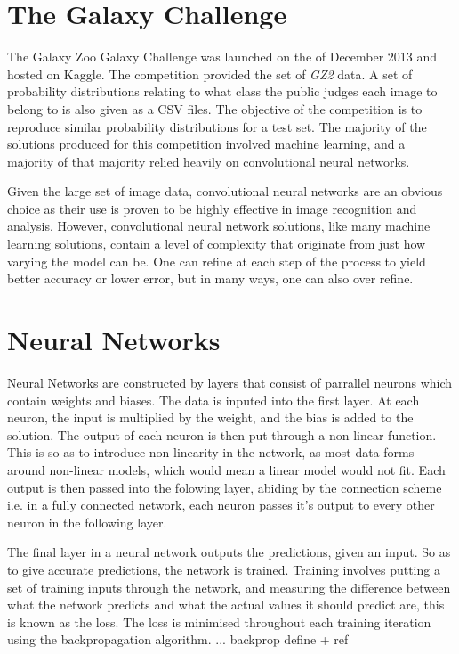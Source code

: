 \documentclass[12pt,a4paper,oneside,oldfontcommands]{memoir}
\begin{document}
\section{The Galaxy Challenge}

The Galaxy Zoo Galaxy Challenge was launched on the  of December 2013 and hosted on Kaggle. The competition provided the set of \textit{GZ2} data. A set of probability distributions relating to what class the public judges each image to belong to is also given as a CSV files. The objective of the competition is to reproduce similar probability distributions for a test set. The majority of the solutions produced for this competition involved machine learning, and a majority of that majority relied heavily on convolutional neural networks.

Given the large set of image data, convolutional neural networks are an obvious choice as their use is proven to be highly effective in image recognition and analysis. However, convolutional neural network solutions, like many machine learning solutions, contain a level of complexity that originate from just how varying the model can be. One can refine at each step of the process to yield better accuracy or lower error, but in many ways, one can also over refine.

\section{Neural Networks}
Neural Networks are constructed by layers that consist of parrallel neurons which contain weights and biases. The data is inputed into the first layer. At each neuron, the input is multiplied by the weight, and the bias is added to the solution.  The output of each neuron is then put through a non-linear function. This is so as to introduce non-linearity in the network, as most data forms around non-linear models, which would mean a linear model would not fit. Each output is then passed into the folowing layer, abiding by the connection scheme i.e. in a fully connected network, each neuron passes it's output to every other neuron in the following layer. 

The final layer in a neural network outputs the predictions, given an input. So as to give accurate predictions, the network is trained. Training involves putting a set of training inputs through the network, and measuring the difference between what the network predicts and what the actual values it should predict are, this is known as the loss. The loss is minimised throughout each training iteration using the backpropagation algorithm. ... backprop define + ref
\end{document}
